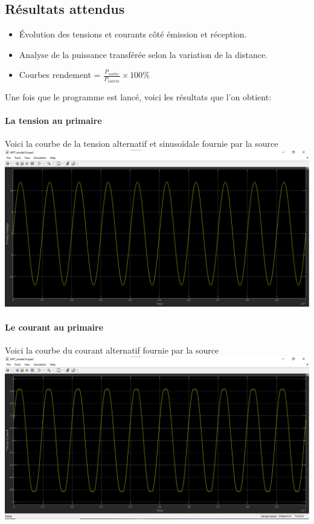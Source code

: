 \documentclass[12pt,a4paper,titlepage,notitlepage]{article}
\begin{document}
	\subsection{Résultats attendus}
	
	\begin{itemize}
		\item Évolution des tensions et courants côté émission et réception.
		\item Analyse de la puissance transférée selon la variation de la distance.
		\item Courbes rendement = $\frac{P_{sortie}}{P_{entrée}} \times 100\%$
	\end{itemize}
	
	Une fois que le programme est lancé, voici les résultats que l'on obtient:
	
	\paragraph{La tension au primaire\\}
	Voici la courbe de la tension alternatif et sinusoïdale fournie par la source\\ 
	\includegraphics[width=1\textwidth]{WPT_simul_pv}
	
	\paragraph{Le courant au primaire\\}
	Voici la courbe du courant alternatif fournie par la source\\ 
	\includegraphics[width=1\textwidth]{WPT_simul_pc}
\end{document}
